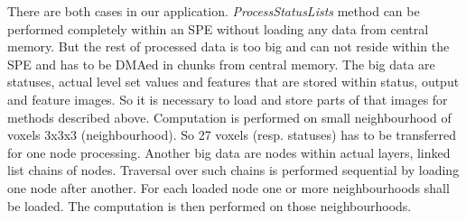 \par
There are both cases in our application.
\emph{ProcessStatusLists} method can be performed completely within an SPE without loading any data from central memory.
But the rest of processed data is too big and can not reside within the SPE and has to be DMAed in chunks from central memory.
The big data are statuses, actual level set values and features that are stored within status, output and feature images.
So it is necessary to load and store parts of that images for methods described above.
Computation is performed on small neighbourhood of voxels 3x3x3 (neighbourhood).
So 27 voxels (resp. statuses) has to be transferred for one node processing.
Another big data are nodes within actual layers, linked list chains of nodes.
Traversal over such chains is performed sequential by loading one node after another.
For each loaded node one or more neighbourhoods shall be loaded.
The computation is then performed on those neighbourhoods.

